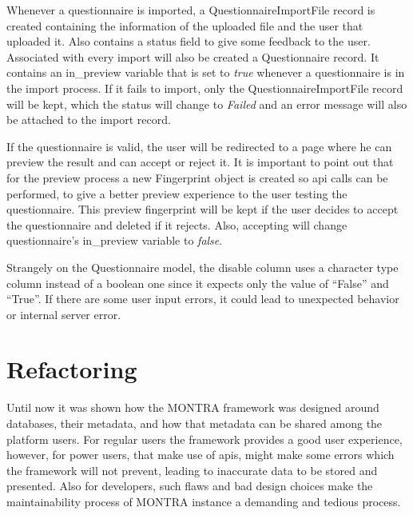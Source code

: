 Whenever a questionnaire is imported, a QuestionnaireImportFile record is created containing the information of the uploaded file and the user that uploaded it.
Also contains a status field to give some feedback to the user.
Associated with every import will also be created a Questionnaire record.
It contains an in\_preview variable that is set to \textit{true} whenever a questionnaire is in the import process.
If it fails to import, only the QuestionnaireImportFile record will be kept, which the status will change to \textit{Failed} and an error message will also be attached to the import record.

If the questionnaire is valid, the user will be redirected to a page where he can preview the result and can accept or reject it.
It is important to point out that for the preview process a new Fingerprint object is created so \gls{api} calls can be performed, to give a better preview experience to the user testing the questionnaire.
This preview fingerprint will be kept if the user decides to accept the questionnaire and deleted if it rejects.
Also, accepting will change questionnaire's in\_preview variable to \textit{false}.

Strangely on the Questionnaire model, the disable column uses a character type column instead of a boolean one since it expects only the value of ``False'' and ``True''.
If there are some user input errors, it could lead to unexpected behavior or internal server error.


\section{Refactoring}


Until now it was shown how the MONTRA framework was designed around databases, their metadata, and how that metadata can be shared among the platform users.
For regular users the framework provides a good user experience, however, for power users, that make use of \gls{api}s, might make some errors which the framework will not prevent, leading to inaccurate data to be stored and presented.
Also for developers, such flaws and bad design choices make the maintainability process of MONTRA instance a demanding and tedious process.

